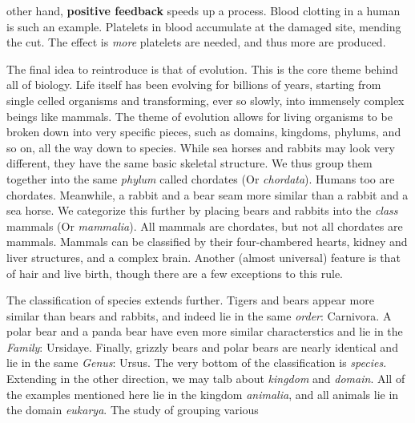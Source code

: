 \documentclass[crop=false,class=book,oneside]{standalone}
\begin{document}
        other hand, \textbf{positive feedback} speeds up
        a process. Blood clotting in a human is such
        an example. Platelets in blood accumulate at the
        damaged site, mending the cut. The effect is
        \textit{more} platelets are needed, and thus more
        are produced. 
        \par\hfill\par
        The final idea to reintroduce is that of evolution.
        This is the core theme behind all of biology.
        Life itself has been evolving for billions
        of years, starting from single celled organisms
        and transforming, ever so slowly, into
        immensely complex beings like mammals. The theme
        of evolution allows for living organisms to be
        broken down into very specific pieces, such as
        domains, kingdoms, phylums, and so on, all the way
        down to species. While sea horses and rabbits may
        look very different, they have the same basic
        skeletal structure. We thus group them together
        into the same \textit{phylum} called
        chordates (Or \textit{chordata}). Humans too are
        chordates. Meanwhile, a rabbit and a bear seam
        more similar than a rabbit and a sea horse. We
        categorize this further by placing bears and
        rabbits into the \textit{class} mammals
        (Or \textit{mammalia}). All mammals are chordates,
        but not all chordates are mammals. Mammals can
        be classified by their four-chambered hearts,
        kidney and liver structures, and a complex brain.
        Another (almost universal) feature is that of
        hair and live birth, though there are a few
        exceptions to this rule.
        \par\hfill\par
        The classification of species extends further.
        Tigers and bears appear more similar than
        bears and rabbits, and indeed lie in the same
        \textit{order}: Carnivora. A polar bear and a
        panda bear have even more similar characterstics
        and lie in the \textit{Family}: Ursidaye.
        Finally, grizzly bears and polar bears are nearly
        identical and lie in the same \textit{Genus}:
        Ursus. The very bottom of the classification is
        \textit{species}. Extending in the other direction,
        we may talb about \textit{kingdom} and
        \textit{domain}. All of the examples mentioned here
        lie in the kingdom \textit{animalia}, and
        all animals lie in the domain
        \textit{eukarya}. The study of grouping various
\end{document}
